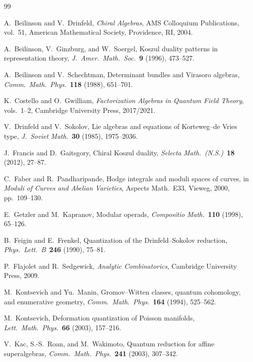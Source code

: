 \documentclass[11pt,reqno]{amsart}
\theoremstyle{definition}
\theoremstyle{remark}
\numberwithin{equation}{section}
\begin{document}
\begin{thebibliography}{99}

A.~Beilinson and V.~Drinfeld,
\textit{Chiral Algebras},
AMS Colloquium Publications, vol.~51,
American Mathematical Society, Providence, RI, 2004.

A.~Beilinson, V.~Ginzburg, and W.~Soergel,
Koszul duality patterns in representation theory,
\textit{J.~Amer.\ Math.\ Soc.}~\textbf{9} (1996), 473--527.

A.~Beilinson and V.~Schechtman,
Determinant bundles and Virasoro algebras,
\textit{Comm.\ Math.\ Phys.}~\textbf{118} (1988), 651--701.

K.~Costello and O.~Gwilliam,
\textit{Factorization Algebras in Quantum Field Theory},
vols.~1--2, Cambridge University Press, 2017/2021.

V.~Drinfeld and V.~Sokolov,
Lie algebras and equations of Korteweg--de Vries type,
\textit{J.~Soviet Math.}~\textbf{30} (1985), 1975--2036.

J.~Francis and D.~Gaitsgory,
Chiral Koszul duality,
\textit{Selecta Math.\ (N.S.)}~\textbf{18} (2012), 27--87.

C.~Faber and R.~Pandharipande,
Hodge integrals and moduli spaces of curves,
in \textit{Moduli of Curves and Abelian Varieties},
Aspects Math.~E33, Vieweg, 2000, pp.~109--130.

E.~Getzler and M.~Kapranov,
Modular operads,
\textit{Compositio Math.}~\textbf{110} (1998), 65--126.

B.~Feigin and E.~Frenkel,
Quantization of the Drinfeld--Sokolov reduction,
\textit{Phys.\ Lett.\ B}~\textbf{246} (1990), 75--81.

P.~Flajolet and R.~Sedgewick,
\textit{Analytic Combinatorics},
Cambridge University Press, 2009.

M.~Kontsevich and Yu.~Manin,
Gromov--Witten classes, quantum cohomology, and enumerative geometry,
\textit{Comm.\ Math.\ Phys.}~\textbf{164} (1994), 525--562.

M.~Kontsevich,
Deformation quantization of Poisson manifolds,
\textit{Lett.\ Math.\ Phys.}~\textbf{66} (2003), 157--216.

V.~Kac, S.-S.~Roan, and M.~Wakimoto,
Quantum reduction for affine superalgebras,
\textit{Comm.\ Math.\ Phys.}~\textbf{241} (2003), 307--342.


\end{thebibliography}
\end{document}
